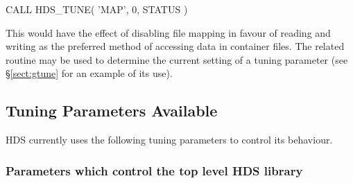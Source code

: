 \documentclass[twoside,11pt]{starlink}
\begin{document}
\begin{description}
\begin{small}
\begin{terminalv}
CALL HDS_TUNE( 'MAP', 0, STATUS )
\end{terminalv}
\end{small}

This would have the effect of disabling file mapping in favour of
reading and writing as the preferred method of accessing data in
container files. The related routine 
may be used to determine the current setting of a tuning parameter
(see \S\ref{sect:gtune} for an example of its use).

\end{description}

\subsection{\label{sect:tuning_parameters}Tuning Parameters Available}

HDS currently uses the following tuning parameters to control its
behaviour.

\subsubsection*{Parameters which control the top level HDS library}
\end{document}
